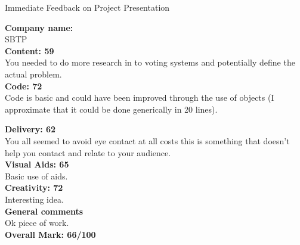 \documentclass{article}
\begin{document}
\begin{center}
\Huge{Immediate Feedback on Project Presentation}\\
\end{center}


\normalsize
\textbf{Company name:}\\

SBTP \\

\textbf{Content: 59}\\

You needed to do more research in to voting systems and potentially define the actual problem.\\

\textbf{Code: 72}\\

Code is basic and could have been improved through the use of objects (I approximate that it could be done generically in 20 lines).

\textbf{Delivery: 62}\\

You all seemed to avoid eye contact at all costs this is something that doesn't help you contact and relate to your audience.\\

\textbf{Visual Aids: 65}\\

Basic use of aids.\\

\textbf{Creativity: 72}\\

Interesting idea.\\

\textbf{General comments}\\

Ok piece of work.\\

\textbf{Overall Mark: 66/100}
\end{document}
